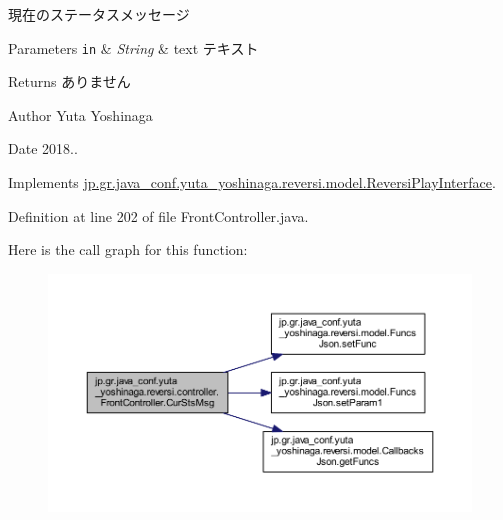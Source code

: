 現在のステータスメッセージ 


\begin{DoxyParams}[1]{Parameters}
\mbox{\tt in}  & {\em String} & text テキスト \\
\hline
\end{DoxyParams}
\begin{DoxyReturn}{Returns}
ありません 
\end{DoxyReturn}
\begin{DoxyAuthor}{Author}
Yuta Yoshinaga 
\end{DoxyAuthor}
\begin{DoxyDate}{Date}
2018.. 
\end{DoxyDate}


Implements \hyperlink{interfacejp_1_1gr_1_1java__conf_1_1yuta__yoshinaga_1_1reversi_1_1model_1_1_reversi_play_interface_ad812b3735df400b42916b15e5c3ff9db}{jp.\+gr.\+java\+\_\+conf.\+yuta\+\_\+yoshinaga.\+reversi.\+model.\+Reversi\+Play\+Interface}.



Definition at line 202 of file Front\+Controller.\+java.

Here is the call graph for this function\+:\nopagebreak
\begin{figure}[H]
\begin{center}
\leavevmode
\includegraphics[width=350pt]{classjp_1_1gr_1_1java__conf_1_1yuta__yoshinaga_1_1reversi_1_1controller_1_1_front_controller_a49315230e704778721afb73c59e14d88_cgraph}
\end{center}
\end{figure}
\mbox{\label{classjp_1_1gr_1_1java__conf_1_1yuta__yoshinaga_1_1reversi_1_1controller_1_1_front_controller_a2f0d63da6e6fc17d2ecf2695af6f8d99}} 
